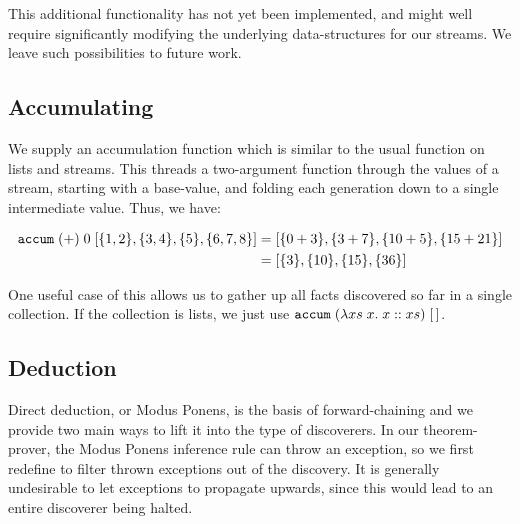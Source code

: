 This additional functionality has not yet been implemented, and might well require significantly modifying the underlying data-structures for our streams. We leave such possibilities to future work.

\subsection{Accumulating}
We supply an accumulation function which is similar to the usual  function on lists and streams. This threads a two-argument function through the values of a stream, starting with a base-value, and folding each generation down to a single intermediate value. Thus, we have:

\begin{align*}
\texttt{accum}\;(+)\;0\;[\{1,2\}, \{3,4\}, \{5\}, \{6,7,8\}] 
&= [\{0 + 3\}, \{3 + 7\}, \{10 + 5\}, \{15 + 21\}]\\
&= [\{3\}, \{10\}, \{15\}, \{36\}]
\end{align*}

One useful case of this allows us to gather up all facts discovered so far in a single collection. If the collection is lists, we just use $\texttt{accum}\;(\lambda xs\;x.\;x :: xs)\;[\,]$.


\subsection{Deduction}
Direct deduction, or Modus Ponens, is the basis of forward-chaining and we provide two main ways to lift it into the type of discoverers. In our theorem-prover, the Modus Ponens inference rule can throw an exception, so we first redefine  to filter thrown exceptions out of the discovery. It is generally undesirable to let exceptions to propagate upwards, since this would lead to an entire discoverer being halted. 

